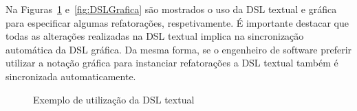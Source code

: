 Na Figuras~\ref{fig:DSLTExtual} e~\ref{fig:DSLGrafica} são mostrados o uso da DSL textual e gráfica para especificar algumas refatorações, respetivamente. É importante destacar que todas as alterações realizadas na DSL textual implica na sincronização automática da DSL gráfica. Da mesma forma, se o engenheiro de software preferir utilizar a notação gráfica para instanciar refatorações a DSL textual também é sincronizada automaticamente. 

\begin{figure}[h!]
 \centering
\caption{Exemplo de utilização da DSL textual}
 \label{fig:DSLTExtual}
\end{figure}
\FloatBarrier

